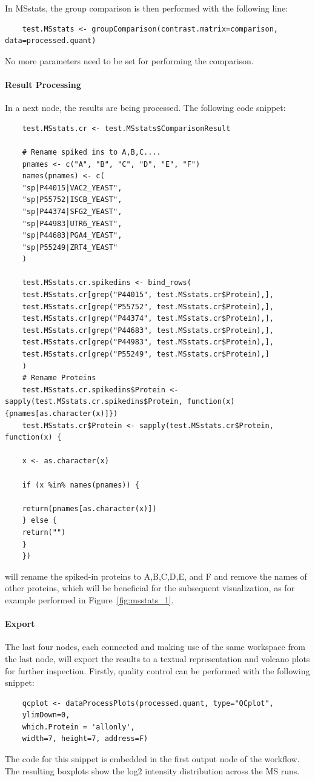 \noindent In MSstats, the group comparison is then performed with the following line:
\begin{lstlisting}
	test.MSstats <- groupComparison(contrast.matrix=comparison, data=processed.quant)
\end{lstlisting}
No more parameters need to be set for performing the comparison.

\paragraph{Result Processing}\mbox{}\newline
\noindent In a next  node, the results are being processed. The following code snippet:
\begin{lstlisting}
	test.MSstats.cr <- test.MSstats$ComparisonResult
	
	# Rename spiked ins to A,B,C....
	pnames <- c("A", "B", "C", "D", "E", "F")
	names(pnames) <- c(
	"sp|P44015|VAC2_YEAST",
	"sp|P55752|ISCB_YEAST",
	"sp|P44374|SFG2_YEAST",
	"sp|P44983|UTR6_YEAST",
	"sp|P44683|PGA4_YEAST",
	"sp|P55249|ZRT4_YEAST"
	)
	
	test.MSstats.cr.spikedins <- bind_rows(
	test.MSstats.cr[grep("P44015", test.MSstats.cr$Protein),],
	test.MSstats.cr[grep("P55752", test.MSstats.cr$Protein),],
	test.MSstats.cr[grep("P44374", test.MSstats.cr$Protein),],
	test.MSstats.cr[grep("P44683", test.MSstats.cr$Protein),],
	test.MSstats.cr[grep("P44983", test.MSstats.cr$Protein),],
	test.MSstats.cr[grep("P55249", test.MSstats.cr$Protein),]
	)
	# Rename Proteins
	test.MSstats.cr.spikedins$Protein <- sapply(test.MSstats.cr.spikedins$Protein, function(x) {pnames[as.character(x)]})
	test.MSstats.cr$Protein <- sapply(test.MSstats.cr$Protein, function(x) {
	
	x <- as.character(x)
	
	if (x %in% names(pnames)) {
	
	return(pnames[as.character(x)]) 
	} else {
	return("")
	}
	})
\end{lstlisting}
will rename the spiked-in proteins to A,B,C,D,E, and F and remove the names of other proteins, which will be beneficial for the subsequent visualization, as
for example performed in Figure~\ref{fig:msstats_1}.


\paragraph{Export}\mbox{}\newline
\noindent The last four nodes, each connected and making use of the same workspace from the last node, will export the results to a textual representation and volcano plots for further inspection. Firstly, quality control can be
performed with the following snippet:
\begin{lstlisting}
	qcplot <- dataProcessPlots(processed.quant, type="QCplot", 
	ylimDown=0, 
	which.Protein = 'allonly',
	width=7, height=7, address=F)
\end{lstlisting}
The code for this snippet is embedded in the first output node
of the workflow. The resulting boxplots show the log2 intensity distribution
across the MS runs.

